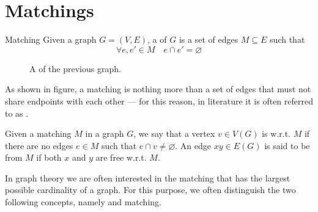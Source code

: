 \documentclass[a4paper, 12pt]{report}
\begin{document}
    \chapter{Matchings}

    \begin{frameddefn}{Matching}
        Given a graph $G = (V, E)$, a  of $G$ is a set of edges $M \subseteq E$ such that $$\forall e, e' \in M \quad e \cap e' = \varnothing$$
    \end{frameddefn}

    \begin{figure}[H]
        \centering
        \caption{A  of the previous graph.}
        \label{matching}
    \end{figure}

    As shown in figure, a matching is nothing more than a set of edges that must not share endpoints with each other — for this reason, in literature it is often referred to as . 

    Given a matching $M$ in a graph $G$, we say that a vertex $v \in V(G)$ is  w.r.t. $M$ if there are no edges $e \in M$ such that $e \cap v \neq \varnothing$. An edge $xy \in E(G)$ is said to be  from $M$ if both $x$ and $y$ are free w.r.t. $M$.

    In graph theory we are often interested in the matching that has the largest possible cardinality of a graph. For this purpose, we often distinguish the two following concepts, namely  and  matching.
\end{document}
